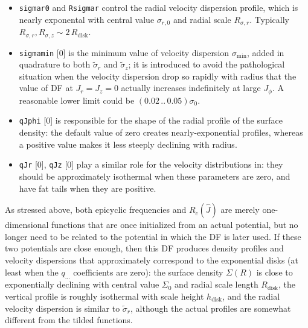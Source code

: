 \documentclass[12pt]{article}
\newcommand{\ppp}[1]{\textcolor{darkolive} {\texttt{#1}}}
\begin{document}
\begin{itemize}
\item \ppp{sigmar0} and \ppp{Rsigmar} control the radial velocity dispersion profile, which is nearly exponental with central value $\sigma_{r,0}$ and radial scale $R_{\sigma,r}$. Typically $R_{\sigma,r}, R_{\sigma,z} \sim 2\,R_\mathrm{disk}$.
\item \ppp{sigmamin} [0] is the minimum value of velocity dispersion $\sigma_\mathrm{min}$, added in quadrature to both $\tilde\sigma_r$ and $\tilde\sigma_z$; it is introduced to avoid the pathological situation when the velocity dispersion drop so rapidly with radius that the value of DF at $J_r=J_z=0$ actually increases indefinitely at large $J_\phi$. A reasonable lower limit could be $(0.02\, .. \, 0.05)\sigma_0$.
\item \ppp{qJphi} [0] is responsible for the shape of the radial profile of the surface density: the default value of zero creates nearly-exponential profiles, whereas a positive value makes it less steeply declining with radius.
\item \ppp{qJr} [0], \ppp{qJz} [0] play a similar role for the velocity distributions in: they should be approximately isothermal when these parameters are zero, and have fat tails when they are positive.
\end{itemize}
As stressed above, both epicyclic frequencies and $R_c(\hat J)$ are merely one-dimensional functions that are once initialized from an actual potential, but no longer need to be related to the potential in which the DF is later used. If these two potentials are close enough, then this DF produces density profiles and velocity dispersions that approximately correspond to the exponential disks (at least when the $q_{\dots}$ coefficients are zero): the surface density $\Sigma(R)$ is close to exponentially declining with central value $\Sigma_0$ and radial scale length $R_\mathrm{disk}$, the vertical profile is roughly isothermal with scale height $h_\mathrm{disk}$, and the radial velocity dispersion is similar to $\tilde\sigma_r$, although the actual profiles are somewhat different from the tilded functions.
\end{document}

